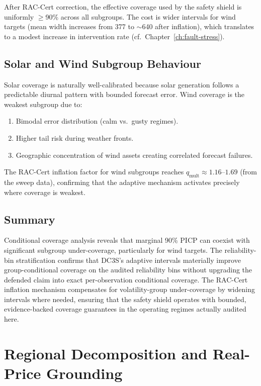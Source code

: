 After RAC-Cert correction, the effective coverage used by the safety
shield is uniformly $\ge$90\% across all subgroups.  The cost is wider
intervals for wind targets (mean width increases from 377 to
$\sim$640 after inflation), which translates to a modest increase in
intervention rate (cf.\ Chapter~\ref{ch:fault-stress}).

\subsection{Solar and Wind Subgroup Behaviour}

Solar coverage is naturally well-calibrated because solar generation
follows a predictable diurnal pattern with bounded forecast error.
Wind coverage is the weakest subgroup due to:

\begin{enumerate}
  \item Bimodal error distribution (calm vs.\ gusty regimes).
  \item Higher tail risk during weather fronts.
  \item Geographic concentration of wind assets creating correlated
    forecast failures.
\end{enumerate}

The RAC-Cert inflation factor for wind subgroups reaches
$q_{\text{mult}} \approx 1.16$--$1.69$ (from the sweep data),
confirming that the adaptive mechanism activates precisely where
coverage is weakest.

\subsection{Summary}

Conditional coverage analysis reveals that marginal 90\% PICP can
coexist with significant subgroup under-coverage, particularly for
wind targets.  The reliability-bin stratification confirms that
DC3S's adaptive intervals materially improve group-conditional coverage on
the audited reliability bins without upgrading the defended claim into exact
per-observation conditional coverage.  The RAC-Cert inflation mechanism
compensates for volatility-group under-coverage by widening intervals
where needed, ensuring that the safety shield operates with bounded,
evidence-backed coverage guarantees in the operating regimes actually
audited here.



\section{Regional Decomposition and Real-Price Grounding}
\label{ch:regional}
\label{ch:transfer-generalisation}

